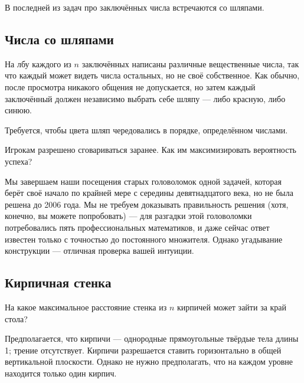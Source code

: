 \medskip

В последней из задач про заключённых числа встречаются со шляпами. 

\subsection*{Числа со шляпами}

На лбу каждого из $n$ заключённых написаны различные вещественные числа, так что каждый может видеть числа остальных, но не своё собственное.
Как обычно, после просмотра никакого общения не допускается, но затем каждый заключённый должен независимо выбрать себе шляпу --- либо красную, либо синюю.

Требуется, чтобы цвета шляп чередовались в порядке, определённом числами.

Игрокам разрешено сговариваться заранее.
Как им максимизировать вероятность успеха?

\medskip

Мы завершаем наши посещения старых головоломок одной задачей, которая берёт своё начало по крайней мере с середины девятнадцатого века, но не была решена до 2006 года.
Мы не требуем доказывать правильность решения (хотя, конечно, вы можете попробовать) --- для разгадки этой головоломки потребовались пять профессиональных математиков, и даже сейчас ответ известен только с точностью до постоянного множителя.
Однако угадывание конструкции --- отличная проверка вашей интуиции.

\subsection*{Кирпичная стенка}\label{Кирпичная стенка}

На какое максимальное расстояние стенка из $n$ кирпичей может зайти за край стола?

Предполагается, что кирпичи --- однородные прямоугольные твёрдые тела длины 1; трение отсутствует.
Кирпичи разрешается ставить горизонтально в общей вертикальной плоскости.
Однако не нужно предполагать, что на каждом уровне находится только один кирпич.
